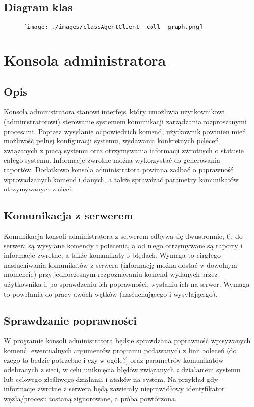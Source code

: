 \documentclass[10pt,a4paper]{article}
\begin{document}
    	\subsection{Diagram klas}
		    \begin{figure}[H]
				\texttt{[image: ./images/classAgentClient\_\_coll\_\_graph.png]}
		    \end{figure}
    
    \section{Konsola administratora}
		\subsection{Opis}
			Konsola administratora stanowi interfejs, który umożliwia użytkownikowi (administratorowi)  sterowanie systemem komunikacji zarządzania rozproszonymi procesami. Poprzez wysyłanie odpowiednich komend, użytkownik powinien mieć możliwość pełnej konfiguracji systemu, wydawania konkretnych poleceń związanych z pracą systemu oraz otrzymywania informacji zwrotnych o statusie całego systemu. Informacje zwrotne można wykorzystać do generowania raportów. Dodatkowo konsola administratora powinna zadbać o poprawność wprowadzanych komend i danych, a także sprawdzać parametry komunikatów otrzymywanych z sieci.
		
		\subsection{Komunikacja z serwerem}
			Komunikacja konsoli administratora z serwerem odbywa się dwustronnie, tj. do serwera są wysyłane komendy i polecenia, a od niego otrzymywane są raporty i informacje zwrotne, a także komunikaty o błędach. Wymaga to ciągłego nasłuchiwania komunikatów z serwera (informację można dostać w dowolnym momencie) przy jednoczesnym rozpoznawaniu komend wydanych przez użytkownika i, po sprawdzeniu ich poprawności, wysłaniu ich na serwer. Wymaga to powołania do pracy dwóch wątków (nasłuchującego i wysyłającego).
		
		\subsection{Sprawdzanie poprawności}
			W programie konsoli administratora będzie sprawdzana poprawność wpisywanych komend, ewentualnych argumentów programu podawanych z linii poleceń (do czego to będzie potrzebne i czy w ogóle?) oraz parametrów komunikatów odebranych z sieci, w celu uniknięcia błędów związanych z działaniem systemu lub celowego złośliwego działania i ataków na system. Na przykład gdy informacje zwrotne z serwera będą zawierały nieprawidłowy identyfikator węzła/procesu zostaną zignorowane, a próba powtórzona.
		
\end{document}
